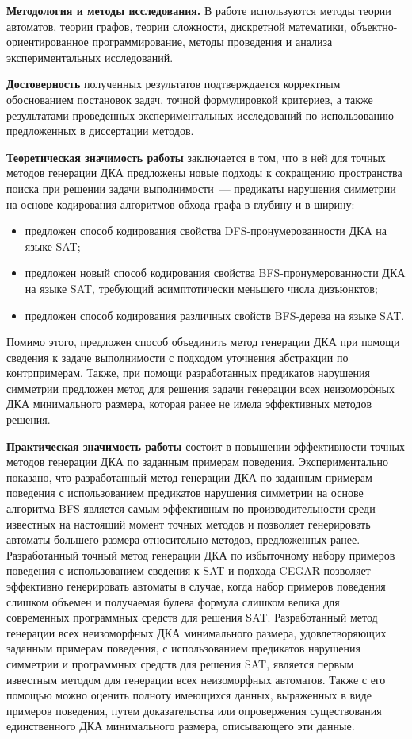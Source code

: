 \textbf{Методология и методы исследования.} В работе используются методы теории автоматов, теории графов, теории сложности, дискретной математики, объектно-ориентированное программирование, методы проведения и анализа экспериментальных исследований.

\textbf{Достоверность} полученных результатов подтверждается корректным обоснованием постановок задач, точной формулировкой критериев, а также результатами проведенных экспериментальных исследований по использованию предложенных в диссертации методов.

\textbf{Теоретическая значимость работы} заключается в том, что в ней для точных методов генерации ДКА предложены новые подходы к сокращению пространства поиска при решении задачи выполнимости~--- предикаты нарушения симметрии на основе кодирования алгоритмов обхода графа в глубину и в ширину:
\begin{itemize}
  \item предложен способ кодирования свойства DFS-пронумерованности ДКА на языке SAT;
  \item предложен новый способ кодирования свойства BFS-пронумерованности ДКА на языке SAT, требующий асимптотически меньшего числа дизъюнктов;
  \item предложен способ кодирования различных свойств BFS-дерева на языке SAT.
\end{itemize}
Помимо этого, предложен способ объединить метод генерации ДКА при помощи сведения к задаче выполнимости с подходом уточнения абстракции по контрпримерам.
Также, при помощи разработанных предикатов нарушения симметрии предложен метод для решения задачи генерации всех неизоморфных ДКА минимального размера, которая ранее не имела эффективных методов решения.

\textbf{Практическая значимость работы} состоит в повышении эффективности точных методов генерации ДКА по заданным примерам поведения. 
Экспериментально показано, что разработанный метод генерации ДКА по заданным примерам поведения с использованием предикатов нарушения симметрии на основе алгоритма BFS является самым эффективным по производительности среди известных на настоящий момент точных методов и позволяет генерировать автоматы большего размера относительно методов, предложенных ранее.
Разработанный точный метод генерации ДКА по избыточному набору примеров поведения с использованием сведения к SAT и подхода CEGAR позволяет эффективно генерировать автоматы в случае, когда набор примеров поведения слишком объемен и получаемая булева формула слишком велика для современных программных средств для решения SAT.
Разработанный метод генерации всех неизоморфных ДКА минимального размера, удовлетворяющих заданным примерам поведения, с использованием предикатов нарушения симметрии и программных средств для решения SAT, является первым известным методом для генерации всех неизоморфных автоматов.
Также с его помощью можно оценить полноту имеющихся данных, выраженных в виде примеров поведения, путем доказательства или опровержения существования единственного ДКА минимального размера, описывающего эти данные.

